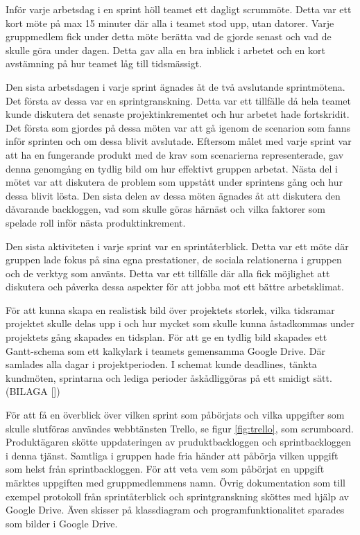 Inför varje arbetsdag i en sprint höll teamet ett dagligt scrummöte. Detta var ett kort möte på max 15 minuter där alla i teamet stod upp, utan datorer. Varje gruppmedlem fick under detta möte berätta vad de gjorde senast och vad de skulle göra under dagen. Detta gav alla en bra inblick i arbetet och en kort avstämning på hur teamet låg till tidsmässigt.

Den sista arbetsdagen i varje sprint ägnades åt de två avslutande sprintmötena. Det första av dessa var en sprintgranskning. Detta var ett tillfälle då hela teamet kunde diskutera det senaste projektinkrementet och hur arbetet hade fortskridit. Det första som gjordes på dessa möten var att gå igenom de scenarion som fanns inför sprinten och om dessa blivit avslutade. Eftersom målet med varje sprint var att ha en fungerande produkt med de krav som scenarierna representerade, gav denna genomgång en tydlig bild om hur effektivt gruppen arbetat. Nästa del i mötet var att diskutera de problem som uppstått under sprintens gång och hur dessa blivit lösta. Den sista delen av dessa möten ägnades åt att diskutera den dåvarande backloggen, vad som skulle göras härnäst och vilka faktorer som spelade roll inför nästa produktinkrement. 

Den sista aktiviteten i varje sprint var en sprintåterblick. Detta var ett möte där gruppen lade fokus på sina egna prestationer, de sociala relationerna i gruppen och de verktyg som använts. Detta var ett tillfälle där alla fick möjlighet att diskutera och påverka dessa aspekter för att jobba mot ett bättre arbetsklimat.

För att kunna skapa en realistisk bild över projektets storlek, vilka tidsramar projektet skulle delas upp i och hur mycket som skulle kunna åstadkommas under projektets gång skapades en tidsplan. För att ge en tydlig bild skapades ett Gantt-schema \cite{softwareeng} som ett kalkylark i teamets gemensamma Google Drive. Där samlades alla dagar i projektperioden. I schemat kunde deadlines, tänkta kundmöten, sprintarna och lediga perioder åskådliggöras på ett smidigt sätt. (BILAGA [])

För att få en överblick över vilken sprint som påbörjats och vilka uppgifter som skulle slutföras användes webbtänsten Trello, se figur \ref{fig:trello}, som scrumboard\cite{scrumboard}. Produktägaren skötte uppdateringen av pruduktbackloggen och sprintbackloggen i denna tjänst. Samtliga i gruppen hade fria händer att påbörja vilken uppgift som helst från sprintbackloggen. För att veta vem som påbörjat en uppgift märktes uppgiften med gruppmedlemmens namn. Övrig dokumentation som till exempel protokoll från sprintåterblick och sprintgranskning sköttes med hjälp av Google Drive. Även skisser på klassdiagram och programfunktionalitet sparades som bilder i Google Drive.

